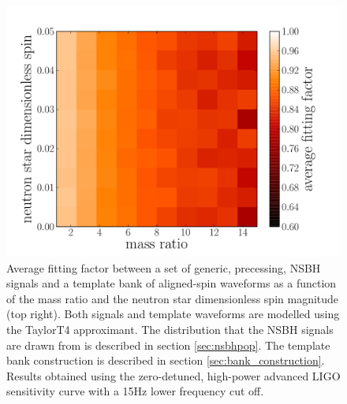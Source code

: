 \begin{figure}
\begin{center}
\includegraphics[width=1.0\textwidth]
{papers/nsbh_effectualness/figure13.pdf}
\end{center}
\caption{\label{fig:nsspin}
Average fitting factor between a set of generic, precessing, NSBH
signals and a template bank of aligned-spin waveforms as a function of the
mass ratio and the neutron star dimensionless spin
magnitude (top right). Both signals and
template waveforms are modelled using the TaylorT4 approximant.
The distribution that the NSBH signals are drawn from
is described in section \ref{sec:nsbhpop}. The template bank construction
is described in section \ref{sec:bank_construction}. Results obtained
using the zero-detuned, high-power advanced LIGO sensitivity curve with a 15Hz
lower frequency cut off.
}
\end{figure}


